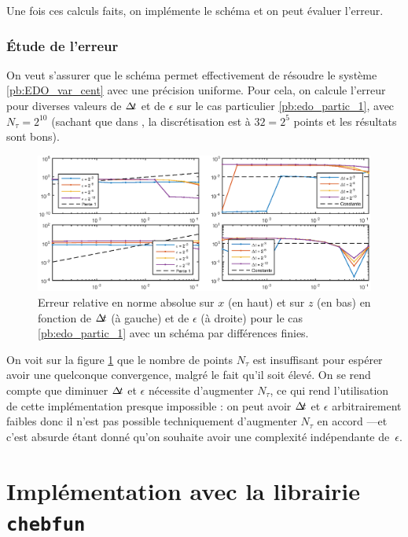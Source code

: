 Une fois ces calculs faits, on implémente le schéma et on peut évaluer l'erreur. 

\subsubsection{Étude de l'erreur} \label{sec:err_loc_df}
On veut s'assurer que le schéma permet effectivement de résoudre le système \eqref{pb:EDO_var_cent} avec une précision uniforme. 
Pour cela, on calcule l'erreur pour diverses valeurs de $\Delta\!\!\!\ t$ et de $\epsilon$ sur le cas particulier \eqref{pb:edo_partic_1}, avec $N_{\tau} = 2^{10}$ (sachant que dans \cite{chartier2015UA}, la discrétisation est à $32 = 2^5$ points et les résultats sont bons). 

\begin{figure}[!h]
\centering\hspace*{-1.3cm}
\includegraphics[width=\textwidth]{img/chap3/conv_rel_df_cas1.eps}
\caption{Erreur relative en norme absolue sur $x$ (en haut) et sur $z$ (en bas) en fonction de $\Delta\!\!\!\ t$ (à gauche) et de $\epsilon$ (à droite) pour le cas \eqref{pb:edo_partic_1} avec un schéma par différences finies.}
\label{fig:conv_interp_cas1}
\end{figure}

On voit sur la figure \ref{fig:conv_interp_cas1} que le nombre de points $N_{\tau}$ est insuffisant pour espérer avoir une quelconque convergence, malgré le fait qu'il soit élevé. 
On se rend compte que diminuer $\Delta\!\!\!\ t$ et $\epsilon$ nécessite d'augmenter $N_{\tau}$, ce qui rend l'utilisation de cette implémentation presque impossible : 
on peut avoir $\Delta\!\!\!\ t$ et $\epsilon$ arbitrairement faibles donc il n'est pas possible techniquement d'augmenter $N_{\tau}$ en accord ---et c'est absurde étant donné qu'on souhaite avoir une complexité indépendante de~$\epsilon$. 


\section{Implémentation avec la librairie \texttt{chebfun}}

